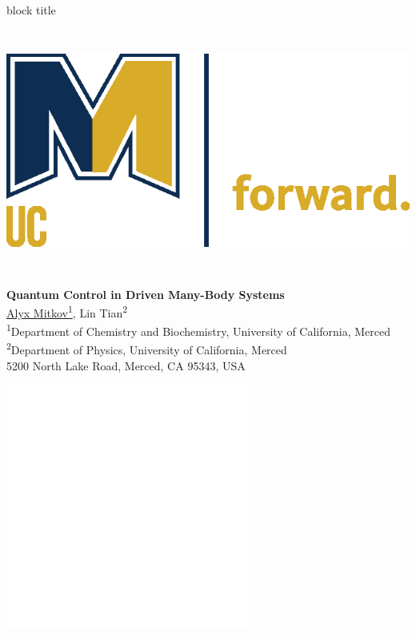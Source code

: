 \documentclass[final]{beamer}
\begin{document}
\newlength{\sepwidth}
\newlength{\colwidth}
\setlength{\sepwidth}{0.025\paperwidth}   %
\setlength{\colwidth}{0.30\paperwidth}    %
\newcommand{\separatorcolumn}{\begin{column}{\sepwidth}\end{column}}

\begin{frame}[t]

  \begin{beamercolorbox}[wd=\paperwidth, colsep=0.5cm]{block title}
    \begin{minipage}[c]{0.15\textwidth}
      \includegraphics[height=8cm]{LeftLogo.eps}
    \end{minipage}\hfill
   \begin{minipage}[c]{0.7\textwidth}
  \centering
  {\Huge \textbf{\textcolor{ucmercedgold}{Quantum Control in Driven Many-Body Systems}}}\\[2ex]
  {\LARGE \underline{Alyx Mitkov\textsuperscript{1}}, Lin Tian\textsuperscript{2}}\\[1ex]
  {\large
    \textsuperscript{1}Department of Chemistry and Biochemistry, University of California, Merced\\
    \textsuperscript{2}Department of Physics, University of California, Merced\\
    5200 North Lake Road, Merced, CA 95343, USA
  }
\end{minipage}
\hfill
    \begin{minipage}[c]{0.15\textwidth}
      \flushright \includegraphics[height=8cm]{RightLogo.eps}

\end{minipage}
\end{beamercolorbox}
\end{frame}
\end{document}
